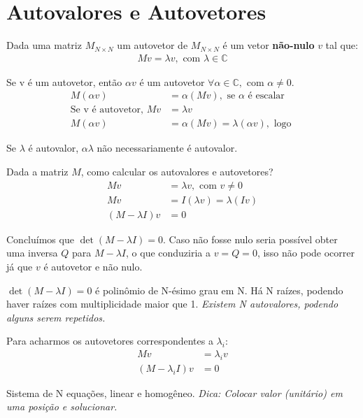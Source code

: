 \documentclass{article}
\renewcommand\bf[1]{\textbf{#1}}
\begin{document}
\setlength{\abovedisplayskip}{12pt}
\setlength{\belowdisplayskip}{12pt}
\setlength{\abovedisplayshortskip}{0pt}
\setlength{\belowdisplayshortskip}{0pt}
\setlength{\jot}{1pt}

\section{Autovalores e Autovetores}
Dada uma matriz $M_{N \times N}$ um autovetor de $M_{N \times N}$ é um vetor \bf{não-nulo} $v$ tal
que:
\begin{align*}
    M v = \lambda v, \text{ com } \lambda \in \mathbb{C}
\end{align*}

Se v é um autovetor, então $\alpha v$ é um autovetor $\forall \alpha \in \mathbb{C}, $ com $\alpha
\neq 0$.
\begin{align*}
    M(\alpha v) &= \alpha (Mv), \text{ se $\alpha$ é escalar} \\
    \text{Se v é autovetor, } Mv &= \lambda v \\
    M(\alpha v) &= \alpha (Mv) = \lambda (\alpha v), \text{ logo }
\end{align*}

Se $\lambda$ é autovalor, $\alpha \lambda$ não necessariamente é  autovalor.

Dada a matriz $M$, como calcular os autovalores e autovetores?
\begin{align*}
    M v &= \lambda v, \text{ com } v \neq 0 \\
    M v &= I (\lambda v) = \lambda (I v) \\
    (M - \lambda I) v &= 0
\end{align*}

Concluímos que $\det(M-\lambda I) = 0$. Caso não fosse nulo seria possível obter uma inversa $Q$
para $M -\lambda I$, o que conduziria a $v = Q = 0$, isso não pode ocorrer já que $v$ é autovetor e
não nulo.

$\det(M-\lambda I) = 0$ é polinômio de N-ésimo grau em N. Há N raízes, podendo haver raízes com
multiplicidade maior que 1. \textit{Existem N autovalores, podendo alguns serem repetidos.}

Para acharmos os autovetores correspondentes a $\lambda_i$:
\begin{align*}
    M v &= \lambda_i v \\
    (M - \lambda_i I)v &= 0
\end{align*}

Sistema de N equações, linear e homogêneo. \textit{Dica: Colocar valor (unitário) em uma posição e solucionar.}
\end{document}
